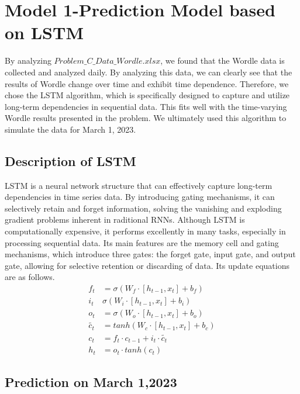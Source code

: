 \documentclass{mcmthesis}  %
\begin{document}
\section{Model 1-Prediction Model based on LSTM}  %

By analyzing \textbf{$Problem\_C\_Data\_Wordle.xlsx$}, we found that the Wordle data is 
collected and analyzed daily. By analyzing this data, we can clearly 
see that the results of Wordle change over time and exhibit time dependence. 
Therefore, we chose the LSTM algorithm, which is specifically designed to 
capture and utilize long-term dependencies in sequential data. This fits 
well with the time-varying Wordle results presented in the problem. We 
ultimately used this algorithm to simulate the data for March 1, 2023.

\subsection{Description of LSTM}
LSTM is a neural network structure that can effectively capture long-term dependencies 
in time series data. By introducing gating mechanisms, it can selectively retain and 
forget information, solving the vanishing and exploding gradient problems inherent in 
raditional RNNs. Although LSTM is computationally expensive, it performs excellently in 
many tasks, especially in processing sequential data. Its main features are the memory 
cell and gating mechanisms, which introduce three gates: the forget gate, input gate, 
and output gate, allowing for selective retention or discarding of data. Its update equations 
are as follows.
\begin{equation} 
\begin{aligned}
        f_{t} &=\sigma(W_{f}\cdot [h_{t-1},x_{t}]+b_{f})\\
        i_{t} &\sigma(W_{i}\cdot [h_{t-1},x_{t}]+b_{i}) \\
        o_{t} &=\sigma(W_{o}\cdot [h_{t-1},x_{t}]+b_{o}) \\
        \tilde{c_{t}} &=tanh(W_{c}\cdot [h_{t-1},x_{t}]+b_{c})\\
        c_{t} &=f_{t}\cdot c_{t-1}+i_{t}\cdot \tilde{c_{t}} \\
        h_{t} &=o_{t}\cdot tanh(c_{t})
\end{aligned}
\end{equation} 
       

\subsection{Prediction on March 1,2023}
\end{document}
